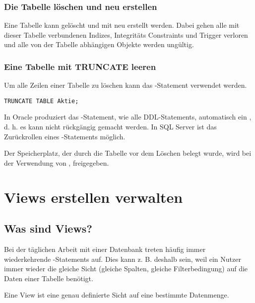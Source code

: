 \subsubsection{Die Tabelle löschen und neu erstellen}
\label{dropandrecreatetable}
Eine Tabelle kann gelöscht und mit  neu
erstellt werden. Dabei gehen alle mit dieser Tabelle verbundenen
Indizes, Integritäts Constraints und Trigger verloren und alle von
der Tabelle abhängigen Objekte werden ungültig.
\subsubsection{Eine Tabelle mit TRUNCATE leeren}
Um alle Zeilen einer Tabelle zu löschen kann das -Statement verwendet werden.
\begin{lstlisting}[language=oracle_sql, caption={Zeilen mit TRUNCATE
          abschneiden},label=sql08_23]
TRUNCATE TABLE Aktie;
          \end{lstlisting}
\begin{merke}
    In Oracle produziert das -Statement, wie
    alle DDL-Statements, automatisch ein , d. h.
    es kann nicht rückgängig gemacht werden. In SQL Server ist das
    Zurückrollen eines -Statements möglich.
\end{merke}

\begin{merke}
    Der Speicherplatz, der durch die Tabelle vor dem Löschen belegt
    wurde, wird bei der Verwendung von ,
    freigegeben.
\end{merke}
\section{Views erstellen verwalten}
\subsection{Was sind Views?}
Bei der täglichen Arbeit mit einer Datenbank treten häufig immer wiederkehrende \SELECT-Statements auf. Dies kann z. B. deshalb sein, weil ein Nutzer immer wieder die gleiche Sicht (gleiche Spalten, gleiche Filterbedingung) auf die Daten einer Tabelle benötigt.

\begin{merke}
    Eine View ist eine genau definierte Sicht auf eine bestimmte Datenmenge.
\end{merke}
